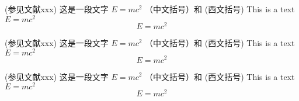 \begin{claim}[测度 measure]
  (参见文献xxx) 这是一段文字 $E = m c^2$  （中文括号）和 (西文括号) 
  This is a text $E = m c^2$
  \[
    E = m c^2
  \]
\end{claim}

\begin{remark}
  (参见文献xxx) 这是一段文字 $E = m c^2$  （中文括号）和 (西文括号) 
  This is a text $E = m c^2$
  \[
    E = m c^2
  \]
\end{remark}


\begin{remark}[测度 measure]
  (参见文献xxx) 这是一段文字 $E = m c^2$  （中文括号）和 (西文括号) 
  This is a text $E = m c^2$
  \[
    E = m c^2
  \]
\end{remark}